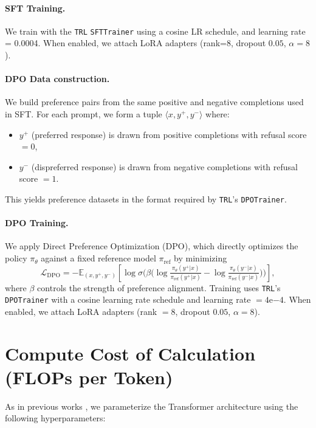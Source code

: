 \documentclass{article} %
\newcommand{\known}[1]{\textcolor{KnownGreen}{#1}}
\newcommand{\unknown}[1]{\textcolor{UnknownRed}{#1}}
\begin{document}
\paragraph{SFT Training.} We train with the \texttt{TRL} \texttt{SFTTrainer} using a cosine LR schedule,  and learning rate = 0.0004. When enabled, we attach LoRA adapters (rank=8, dropout $0.05$, $\alpha=8$). 

\paragraph{DPO Data construction.}
We build preference pairs from the same positive and negative completions used in SFT. For each prompt, we form a tuple $\langle x, y^{+}, y^{-}\rangle$ where:
\begin{itemize}
    \item $y^{+}$ (preferred response) is drawn from \known{positive} completions with refusal score $=0$,
    \item $y^{-}$ (dispreferred response) is drawn from \unknown{negative} completions with refusal score $=1$.
\end{itemize}
This yields preference datasets in the format required by \texttt{TRL}'s \texttt{DPOTrainer}.  

\paragraph{DPO Training.} 
We apply Direct Preference Optimization (DPO), which directly optimizes the policy $\pi_\theta$ against a fixed reference model $\pi_\text{ref}$ by minimizing
\[
\mathcal{L}_\text{DPO} = -\mathbb{E}_{(x, y^+, y^-)}\!\left[\log\sigma\!\Big(\beta\big(\log\tfrac{\pi_\theta(y^+|x)}{\pi_\text{ref}(y^+|x)} - \log\tfrac{\pi_\theta(y^-|x)}{\pi_\text{ref}(y^-|x)}\big)\Big)\right],
\]
where $\beta$ controls the strength of preference alignment.  
Training uses \texttt{TRL}'s \texttt{DPOTrainer} with a cosine learning rate schedule and learning rate $= 4\text{e}{-4}$. When enabled, we attach LoRA adapters (rank $=8$, dropout $0.05$, $\alpha=8$).  


\section{Compute Cost of Calculation (FLOPs per Token)}
\label{app:flops}

As in previous works \citep{kaplan2020scalinglawsneurallanguage},  we parameterize the Transformer architecture using the following hyperparameters:
\end{document}
